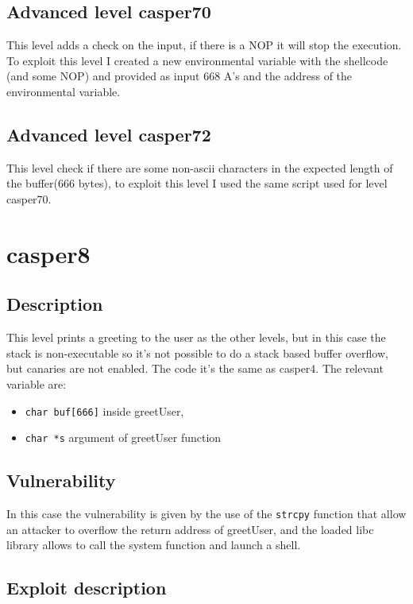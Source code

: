 \documentclass[a4paper,12pt]{article}
\begin{document}
\subsection{Advanced level casper70}

This level adds a check on the input, if there is a NOP it will stop the execution. To exploit this level I created a new environmental variable with the shellcode (and some NOP) and provided as input 668 A's and the address of the environmental variable.

\subsection{Advanced level casper72}
This level check if there are some non-ascii characters in the expected length of the buffer(666 bytes), to exploit this level I used the same script used for level casper70.


\section{casper8}
\subsection{Description}

This level prints a greeting to the user as the other levels, but in this case the stack is non-executable so it's not possible to do a stack based buffer overflow, but canaries are not enabled. The code it's the same as casper4.
The relevant variable are:

\begin{itemize}
\item \texttt{char buf[666]} inside greetUser,
\item \texttt{char *s} argument of greetUser function
\end{itemize}

\subsection{Vulnerability}

In this case the vulnerability is given by the use of the \texttt{strcpy} function that allow an attacker to overflow the return address of greetUser, and the loaded libc library allows to call the system function and launch a shell.

\subsection{Exploit description} 
\end{document}
